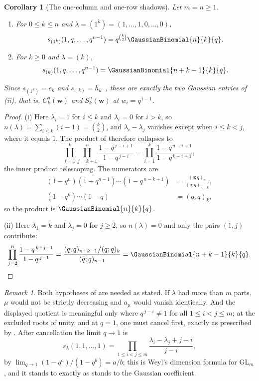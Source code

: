\documentclass[11pt,a4paper,oneside,openany]{book}
\newtheorem{corollary}[corollary]{Corollary}
\theoremstyle{definition}
\theoremstyle{remark}
\newtheorem{remark}[remark]{Remark}
\begin{document}
\begin{corollary}[The one-column and one-row shadows]\label{cor:schur-e-h}
Let $m=n\ge1$.
\begin{enumerate}[label=\textup{(\roman*)}]
\item For $0\le k\le n$ and $\lambda=(1^k)=(1,\ldots,1,0,\ldots,0)$,
\[
 s_{(1^k)}(1,q,\ldots,q^{n-1})=q^{\binom k2}\GaussianBinomial{n}{k}{q}.
\]
\item For $k\ge0$ and $\lambda=(k)$,
\[
 s_{(k)}(1,q,\ldots,q^{n-1})=\GaussianBinomial{n+k-1}{k}{q}.
\]
\end{enumerate}
Since $s_{(1^k)}=e_k$ and $s_{(k)}=h_k$~\cite{Macdonald1995}, these are
exactly the two Gaussian entries of (ii),
that is, $C_k^n(\mathbf w)$ and $S_k^n(\mathbf w)$ at $w_i=q^{\,i-1}$.
\end{corollary}

\begin{proof}
(i) Here $\lambda_i=1$ for $i\le k$ and $\lambda_i=0$ for $i>k$, so
$n(\lambda)=\sum_{i\le k}(i-1)=\binom k2$, and $\lambda_i-\lambda_j$ vanishes
except when $i\le k<j$, where it equals $1$.  The product of
 therefore collapses to
\[
 \prod_{i=1}^{k}\prod_{j=k+1}^{n}
 \frac{1-q^{\,j-i+1}}{1-q^{\,j-i}}
 =\prod_{i=1}^{k}\frac{1-q^{\,n-i+1}}{1-q^{\,k-i+1}},
\]
the inner product telescoping.  The numerators are
\[
 \begin{aligned}
 (1-q^{n})(1-q^{n-1})\cdots(1-q^{\,n-k+1})
   &=\frac{(q;q)_n}{(q;q)_{n-k}},\\
 (1-q^k)\cdots(1-q)&=(q;q)_k,
 \end{aligned}
\]
so the product is $\GaussianBinomial{n}{k}{q}$.

(ii) Here $\lambda_1=k$ and $\lambda_j=0$ for $j\ge2$, so $n(\lambda)=0$ and
only the pairs $(1,j)$ contribute:
\[
 \prod_{j=2}^{n}\frac{1-q^{\,k+j-1}}{1-q^{\,j-1}}
 =\frac{(q;q)_{n+k-1}\big/(q;q)_k}{(q;q)_{n-1}}
 =\GaussianBinomial{n+k-1}{k}{q}.
 \qedhere
\]
\end{proof}

\begin{remark}\label{rem:schur-hypotheses}
Both hypotheses of  are needed as stated.  If
$\lambda$ had more than $m$ parts, $\mu$ would not be strictly decreasing and
$a_\mu$ would vanish identically.  And the displayed quotient is meaningful
only where $q^{\,j-i}\ne1$ for all $1\le i<j\le m$; at the excluded roots of
unity, and at $q=1$, one must cancel first, exactly as prescribed by
.  After cancellation the limit $q\to1$ is
\[
 s_\lambda(1,1,\ldots,1)
 =\prod_{1\le i<j\le m}\frac{\lambda_i-\lambda_j+j-i}{j-i},
\]
by $\lim_{q\to1}(1-q^a)/(1-q^b)=a/b$; this is Weyl's dimension formula for
$\mathrm{GL}_m$, and it stands to  exactly as
 stands to the Gaussian coefficient.
\end{remark}
\end{document}
